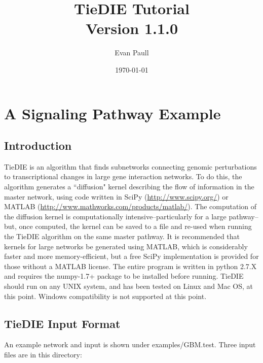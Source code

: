 \documentclass[11pt]{report}
\author{Evan Paull \emailaddr{epaull@soe.ucsc.edu}}
\title{TieDIE Tutorial \\ Version 1.1.0}
\date{\today}
\begin{document}
\maketitle

\tableofcontents

\singlespace

\chapter{A Signaling Pathway Example}

\section{Introduction}

\noindent TieDIE is an algorithm that finds subnetworks connecting genomic perturbations to transcriptional changes in 
large gene interaction networks. To do this, the algorithm generates a ``diffusion" kernel describing
the flow of information in the master network, using code written in SciPy (\url{http://www.scipy.org/}) or 
 MATLAB (\url{http://www.mathworks.com/products/matlab/}). The computation of the diffusion kernel is computationally
intensive--particularly for a large pathway--but, once computed, the kernel can be saved to a file and re-used
when running the TieDIE algorithm on the same master pathway. It is recommended that kernels for large networks
be generated using MATLAB, which is considerably faster and more memory-efficient, but a free SciPy implementation is 
provided for those without a MATLAB license. The entire program is written in python 2.7.X and requires the numpy-1.7+
package to be installed before running. TieDIE should run on any UNIX system, and has been tested on Linux and Mac OS, at this 
point. Windows compatibility is not supported at this point. 

\section{TieDIE Input Format}

\noindent An example network and input is shown under examples/GBM.test. Three input files are in this directory: 
\end{document}
